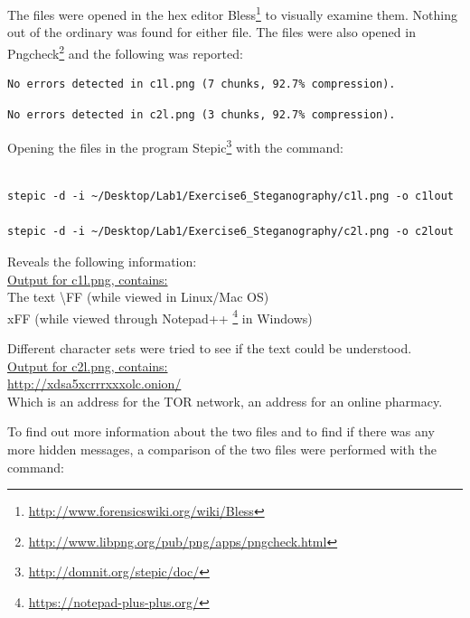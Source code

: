 \documentclass[a4paper,10pt,oneside]{article}
\begin{document}
The files were opened in the hex editor Bless\footnote{\url{http://www.forensicswiki.org/wiki/Bless}} 
to visually examine them. Nothing out of the ordinary was found for either file.
The files were also opened in Pngcheck\footnote{\url{http://www.libpng.org/pub/png/apps/pngcheck.html}}
and the following was reported:


\begin{lstlisting}[caption=c1l.png]
No errors detected in c1l.png (7 chunks, 92.7% compression).
\end{lstlisting}

\begin{lstlisting}[caption=c2l.png]
No errors detected in c2l.png (3 chunks, 92.7% compression).
\end{lstlisting}

Opening the files in the program Stepic\footnote{\url{http://domnit.org/stepic/doc/}}
with the command:

\begin{lstlisting}[caption=stepic command]

stepic -d -i ~/Desktop/Lab1/Exercise6_Steganography/c1l.png -o c1lout

stepic -d -i ~/Desktop/Lab1/Exercise6_Steganography/c2l.png -o c2lout

\end{lstlisting}

Reveals the following information:\\

\underline{Output for c1l.png, contains:}\\
\newline
The text \textbackslash FF (while viewed in Linux/Mac OS)\\xFF (while viewed through Notepad++
\footnote{\url{https://notepad-plus-plus.org/}}
in Windows)
\newline

Different character sets were tried to see if the text could be understood.\\


\underline{Output for c2l.png, contains:}\\
\newline
\url{http://xdsa5xcrrrxxxolc.onion/}\\

Which is an address for the TOR network, an address for an online pharmacy.


To find out more information about the two files and to find if there was any more hidden messages, a comparison of the two files were performed with the command:\\
\end{document}
